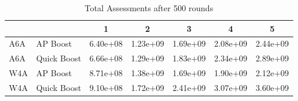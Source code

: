 \begin{table*}[t]
\caption{Total Assessments after 500 rounds}
\label{tbl:pulls-at-depth}
\vskip 0.15in
\begin{center}
\begin{small}
\begin{sc}
\begin{tabular}{llccccc}
\toprule
 &  & 1 & 2 & 3 & 4 & 5\\
\midrule
A6A & AP Boost & 6.40e+08 & 1.23e+09 & 1.69e+09 & 2.08e+09 & 2.44e+09 \\
A6A & Quick Boost & 6.66e+08 & 1.29e+09 & 1.83e+09 & 2.34e+09 & 2.89e+09 \\
W4A & AP Boost & 8.71e+08 & 1.38e+09 & 1.69e+09 & 1.90e+09 & 2.12e+09 \\
W4A & Quick Boost & 9.10e+08 & 1.72e+09 & 2.41e+09 & 3.07e+09 & 3.60e+09 \\
\bottomrule
\end{tabular}
\end{sc}
\end{small}
\end{center}
\vskip -0.1in
\end{table*}
